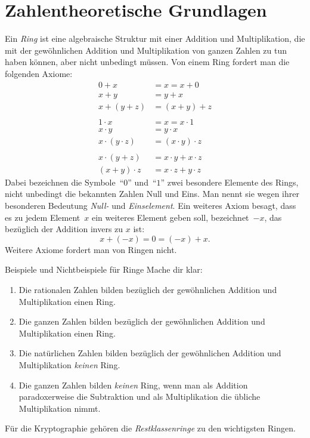 \documentclass{../zirkelblatt}
\newcommand{\head}[1]{\section*{\rmfamily #1}}%
\begin{document}


\head{Zahlentheoretische Grundlagen}

Ein \emph{Ring} ist eine algebraische Struktur mit einer Addition und
Multiplikation, die mit der gewöhnlichen Addition und Multiplikation von ganzen
Zahlen zu tun haben können, aber nicht unbedingt müssen. Von einem Ring fordert
man die folgenden Axiome:
\begin{align*}
    0 + x &= x = x + 0 \\
    x + y &= y + x \\
    x + (y + z) &= (x + y) + z \\\\
    1 \cdot x &= x = x \cdot 1 \\
    x \cdot y &= y \cdot x \\
    x \cdot (y \cdot z) &= (x \cdot y) \cdot z \\\\
    x \cdot (y + z) &= x \cdot y + x \cdot z \\
    (x + y) \cdot z &= x \cdot z + y \cdot z
\end{align*}
Dabei bezeichnen die Symbole~"`$0$"' und~"`$1$"' zwei besondere Elemente des
Rings, nicht unbedingt die bekannten Zahlen Null und Eins. Man nennt sie wegen
ihrer besonderen Bedeutung \emph{Null-} und \emph{Einselement}. Ein weiteres
Axiom besagt, dass es zu jedem Element~$x$ ein weiteres Element geben soll,
bezeichnet~$-x$, das bezüglich der Addition invers zu $x$ ist:
\[ x + (-x) = 0 = (-x) + x. \]
Weitere Axiome fordert man von Ringen nicht.
\vspace{\aufgabenskip}

\begin{aufgabe}{Beispiele und Nichtbeispiele für Ringe}
Mache dir klar:
\begin{enumerate}
\item Die rationalen Zahlen bilden bezüglich der gewöhnlichen
Addition und Multiplikation einen Ring.
\item Die ganzen Zahlen bilden bezüglich der gewöhnlichen
Addition und Multiplikation einen Ring.
\item Die natürlichen Zahlen bilden bezüglich der gewöhnlichen Addition und
Multiplikation \emph{keinen} Ring.
\item Die ganzen Zahlen bilden \emph{keinen} Ring, wenn man als Addition
paradoxerweise die Subtraktion und als Multiplikation die übliche
Multiplikation nimmt.
\end{enumerate}
Für die Kryptographie gehören die \emph{Restklassenringe} zu den wichtigsten
Ringen.
\end{aufgabe}
\end{document}
